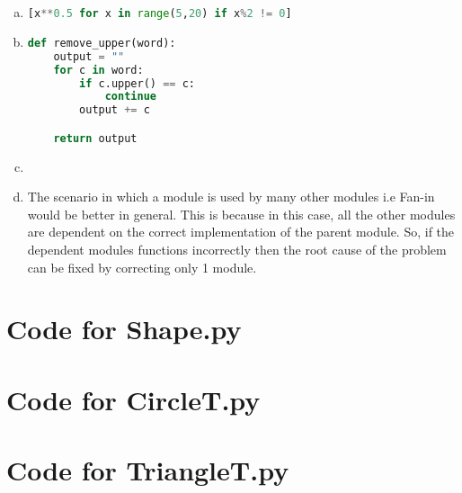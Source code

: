 \documentclass[12pt]{article}
\begin{document}
\begin{enumerate}[a)]
	\item \begin{lstlisting}[language=Python]
[x**0.5 for x in range(5,20) if x%2 != 0]
	\end{lstlisting}

	\item \begin{lstlisting}[language=Python]
def remove_upper(word):
    output = ""
    for c in word:
        if c.upper() == c:
            continue
        output += c

    return output
		  \end{lstlisting}

	\item 

	\item The scenario in which a module is used by many other modules i.e Fan-in would be better in general. This is because in this case, all the other modules are dependent on the correct implementation of the parent module. So, if the dependent modules functions incorrectly then the root cause of the problem can be fixed by correcting only 1 module. 

\end{enumerate}

\newpage

\lstset{language=Python, basicstyle=\tiny, breaklines=true, showspaces=false,
  showstringspaces=false, breakatwhitespace=true}

\def\thesection{\Alph{section}}

\section{Code for Shape.py}

\noindent 

\newpage

\section{Code for CircleT.py}

\noindent 

\newpage

\section{Code for TriangleT.py}
\end{document}
